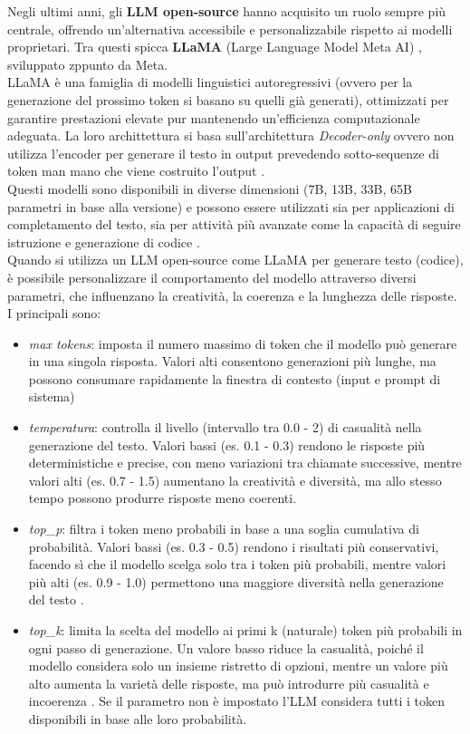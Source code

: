 \documentclass{article}
\begin{document}
Negli ultimi anni, gli \textbf{LLM open-source} hanno acquisito un ruolo sempre più centrale, offrendo un’alternativa accessibile e personalizzabile rispetto ai modelli proprietari. Tra questi spicca \textbf{LLaMA} (Large Language Model Meta AI) \cite{journals/corr/abs-2302-13971}, sviluppato zppunto da Meta.\\
LLaMA è una famiglia di modelli linguistici autoregressivi (ovvero per la generazione del prossimo token si basano su quelli già generati), ottimizzati per garantire prestazioni elevate pur mantenendo un’efficienza computazionale adeguata. La loro archittettura si basa sull'architettura \textit{Decoder-only} ovvero non utilizza l'encoder per generare il testo in output prevedendo sotto-sequenze di token man mano che viene costruito l'output \cite{hou2024large}.\\
Questi modelli sono disponibili in diverse dimensioni (7B, 13B, 33B, 65B parametri in base alla versione) e possono essere utilizzati sia per applicazioni di completamento del testo, sia per attività più avanzate come la capacità di seguire istruzione e generazione di codice \cite{hou2024large}.\\
Quando si utilizza un LLM open-source come LLaMA per generare testo (codice), è possibile personalizzare il comportamento del modello attraverso diversi parametri, che influenzano la creatività, la coerenza e la lunghezza delle risposte. I principali sono:
\begin{itemize}
    \item \textit{max tokens}: imposta il numero massimo di token che il modello può generare in una singola risposta. Valori alti consentono generazioni più lunghe, ma possono consumare rapidamente la finestra di contesto (input e prompt di sistema)
    \item \textit{temperatura}: controlla il livello (intervallo tra 0.0 - 2) di casualità nella generazione del testo\cite{peeperkorn2024temperaturecreativityparameterlarge}. Valori bassi (es. 0.1 - 0.3) rendono le risposte più deterministiche e precise, con meno variazioni tra chiamate successive, mentre valori alti (es. 0.7 - 1.5) aumentano la creatività e diversità, ma allo stesso tempo possono produrre risposte meno coerenti.
    \item \textit{top\_p}: filtra i token meno probabili in base a una soglia cumulativa di probabilità. Valori bassi (es. 0.3 - 0.5) rendono i risultati più conservativi, facendo sì che il modello scelga solo tra i token più probabili, mentre valori più alti (es. 0.9 - 1.0) permettono una maggiore diversità nella generazione del testo \cite{Ruman2024}.
    \item \textit{top\_k}: limita la scelta del modello ai primi
    k (naturale) token più probabili in ogni passo di generazione. Un valore basso riduce la casualità, poiché il modello considera solo un insieme ristretto di opzioni, mentre un valore più alto aumenta la varietà delle risposte, ma può introdurre più casualità e incoerenza \cite{Ruman2024}. Se il parametro non è impostato l'LLM considera tutti i token disponibili in base alle loro probabilità.
\end{itemize}
\end{document}
